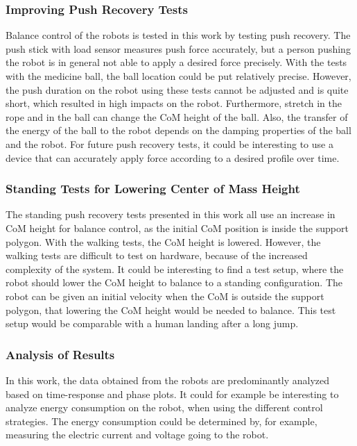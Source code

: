 \subsubsection{Improving Push Recovery Tests}
Balance control of the robots is tested in this work by testing push recovery. The push stick with load sensor \cite{iload} measures push force accurately, but a person pushing the robot is in general not able to apply a desired force precisely. With the tests with the medicine ball, the ball location could be put relatively precise. However, the push duration on the robot using these tests cannot be adjusted and is quite short, which resulted in high impacts on the robot. Furthermore, stretch in the rope and in the ball can change the \ac{CoM} height of the ball. Also, the transfer of the energy of the ball to the robot depends on the damping properties of the ball and the robot. For future push recovery tests, it could be interesting to use a device that can accurately apply force according to a desired profile over time.
\subsubsection{Standing Tests for Lowering Center of Mass Height}
The standing push recovery tests presented in this work all use an increase in \ac{CoM} height for balance control, as the initial \ac{CoM} position is inside the support polygon. With the walking tests, the \ac{CoM} height is lowered. However, the walking tests are difficult to test on hardware, because of the increased complexity of the system. It could be interesting to find a test setup, where the robot should lower the \ac{CoM} height to balance to a standing configuration. The robot can be given an initial velocity when the \ac{CoM} is outside the support polygon, that lowering the \ac{CoM} height would be needed to balance. This test setup would be comparable with a human landing after a long jump.
\subsubsection{Analysis of Results}
In this work, the data obtained from the robots are predominantly analyzed based on time-response and phase plots. It could for example be interesting to analyze energy consumption on the robot, when using the different control strategies. The energy consumption could be determined by, for example, measuring the electric current and voltage going to the robot.

